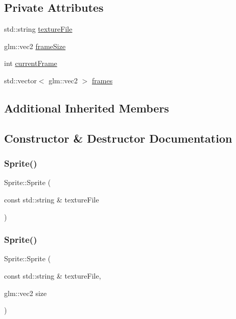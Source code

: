 \subsection*{Private Attributes}
\begin{DoxyCompactItemize}
\item 
std\+::string \mbox{\hyperlink{classsage_1_1Sprite_a3ad65ff16f4f98a15f52092b1542838b}{texture\+File}}
\item 
glm\+::vec2 \mbox{\hyperlink{classsage_1_1Sprite_ae6d6160fb0c882acd8b786d2353208e6}{frame\+Size}}
\item 
int \mbox{\hyperlink{classsage_1_1Sprite_aae69224b9c75eb83097f02d484975f68}{current\+Frame}}
\item 
std\+::vector$<$ glm\+::vec2 $>$ \mbox{\hyperlink{classsage_1_1Sprite_ad6aa87dfe1f1ce53e2de2df0aa10f229}{frames}}
\end{DoxyCompactItemize}
\subsection*{Additional Inherited Members}


\subsection{Constructor \& Destructor Documentation}
\mbox{\label{classsage_1_1Sprite_abae47a15ec83a91f3b714db14f2a492b}} 
\subsubsection{\texorpdfstring{Sprite()}{Sprite()}\hspace{0.1cm}{\footnotesize\ttfamily [1/3]}}
{\footnotesize\ttfamily Sprite\+::\+Sprite (\begin{DoxyParamCaption}\item[{const std\+::string \&}]{texture\+File }\end{DoxyParamCaption})}

\mbox{\label{classsage_1_1Sprite_a76a269d903de2837314b42c3d43f0df2}} 
\subsubsection{\texorpdfstring{Sprite()}{Sprite()}\hspace{0.1cm}{\footnotesize\ttfamily [2/3]}}
{\footnotesize\ttfamily Sprite\+::\+Sprite (\begin{DoxyParamCaption}\item[{const std\+::string \&}]{texture\+File,  }\item[{glm\+::vec2}]{size }\end{DoxyParamCaption})}

